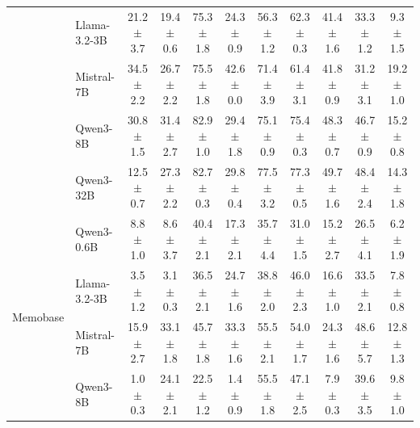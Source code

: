 \begin{table}[t]
\begin{tabular}{@{}ll ccccccccc@{}}
  & Llama-3.2-3B   & 21.2{\scriptsize$\pm$3.7} & 19.4{\scriptsize$\pm$0.6} & 75.3{\scriptsize$\pm$1.8} & 24.3{\scriptsize$\pm$0.9} & 56.3{\scriptsize$\pm$1.2} & 62.3{\scriptsize$\pm$0.3} & 41.4{\scriptsize$\pm$1.6} & 33.3{\scriptsize$\pm$1.2} & 9.3{\scriptsize$\pm$1.5} \\

  & Mistral-7B     & 34.5{\scriptsize$\pm$2.2} & 26.7{\scriptsize$\pm$2.2} & 75.5{\scriptsize$\pm$1.8} & 42.6{\scriptsize$\pm$0.0} & 71.4{\scriptsize$\pm$3.9} & 61.4{\scriptsize$\pm$3.1} & 41.8{\scriptsize$\pm$0.9} & 31.2{\scriptsize$\pm$3.1} & 19.2{\scriptsize$\pm$1.0} \\

  & Qwen3-8B       & 30.8{\scriptsize$\pm$1.5} & 31.4{\scriptsize$\pm$2.7} & 82.9{\scriptsize$\pm$1.0} & 29.4{\scriptsize$\pm$1.8} & 75.1{\scriptsize$\pm$0.9} & 75.4{\scriptsize$\pm$0.3} & 48.3{\scriptsize$\pm$0.7} & 46.7{\scriptsize$\pm$0.9} & 15.2{\scriptsize$\pm$0.8} \\

  & Qwen3-32B      & 12.5{\scriptsize$\pm$0.7} & 27.3{\scriptsize$\pm$2.2} & 82.7{\scriptsize$\pm$0.3} & 29.8{\scriptsize$\pm$0.4} & 77.5{\scriptsize$\pm$3.2} & 77.3{\scriptsize$\pm$0.5} & 49.7{\scriptsize$\pm$1.6} & 48.4{\scriptsize$\pm$2.4} & 14.3{\scriptsize$\pm$1.8} \\
\midrule
\multirow{5}{*}{Memobase}
  & Qwen3-0.6B     & 8.8{\scriptsize$\pm$1.0} & 8.6{\scriptsize$\pm$3.7} & 40.4{\scriptsize$\pm$2.1} & 17.3{\scriptsize$\pm$2.1} & 35.7{\scriptsize$\pm$4.4} & 31.0{\scriptsize$\pm$1.5} & 15.2{\scriptsize$\pm$2.7} & 26.5{\scriptsize$\pm$4.1} & 6.2{\scriptsize$\pm$1.9} \\

  & Llama-3.2-3B   & 3.5{\scriptsize$\pm$1.2} & 3.1{\scriptsize$\pm$0.3} & 36.5{\scriptsize$\pm$2.1} & 24.7{\scriptsize$\pm$1.6} & 38.8{\scriptsize$\pm$2.0} & 46.0{\scriptsize$\pm$2.3} & 16.6{\scriptsize$\pm$1.0} & 33.5{\scriptsize$\pm$2.1} & 7.8{\scriptsize$\pm$0.8} \\

  & Mistral-7B     & 15.9{\scriptsize$\pm$2.7} & 33.1{\scriptsize$\pm$1.8} & 45.7{\scriptsize$\pm$1.8} & 33.3{\scriptsize$\pm$1.6} & 55.5{\scriptsize$\pm$2.1} & 54.0{\scriptsize$\pm$1.7} & 24.3{\scriptsize$\pm$1.6} & 48.6{\scriptsize$\pm$5.7} & 12.8{\scriptsize$\pm$1.3} \\

  & Qwen3-8B       & 1.0{\scriptsize$\pm$0.3} & 24.1{\scriptsize$\pm$2.1} & 22.5{\scriptsize$\pm$1.2} & 1.4{\scriptsize$\pm$0.9} & 55.5{\scriptsize$\pm$1.8} & 47.1{\scriptsize$\pm$2.5} & 7.9{\scriptsize$\pm$0.3} & 39.6{\scriptsize$\pm$3.5} & 9.8{\scriptsize$\pm$1.0} \\


\end{tabular}
\end{table}
